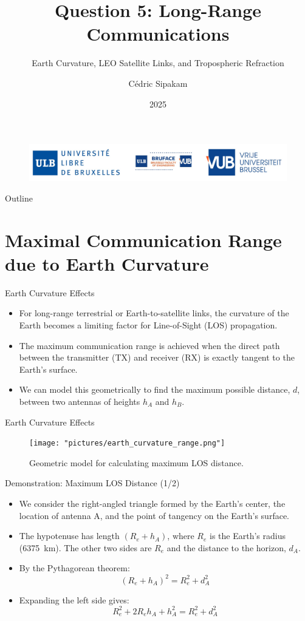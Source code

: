 \documentclass{beamer}
\title[Long-Range Communications]{Question 5: Long-Range Communications}
\subtitle{Earth Curvature, LEO Satellite Links, and Tropospheric Refraction}
\author{Cédric Sipakam}
\institute{ULB | VUB \\
	\vspace{1.5em}
	ELEC-H415: Communication Channels}
\date{2025}
\begin{document}
	\begin{frame}
		\begin{figure}
			\centering
			\includegraphics[width=0.7\linewidth]{pictures/logos}
		\end{figure}
		\titlepage
	\end{frame}
	
	\begin{frame}{Outline}
		\tableofcontents
	\end{frame}
	
	\section{Maximal Communication Range due to Earth Curvature}
	
	\begin{frame}{Earth Curvature Effects}
		\begin{itemize}
			\item For long-range terrestrial or Earth-to-satellite links, the curvature of the Earth becomes a limiting factor for Line-of-Sight (LOS) propagation.
			\item The maximum communication range is achieved when the direct path between the transmitter (TX) and receiver (RX) is exactly tangent to the Earth's surface.
			\item We can model this geometrically to find the maximum possible distance, $d$, between two antennas of heights $h_A$ and $h_B$.
		\end{itemize}
	\end{frame}
	
	\begin{frame}{Earth Curvature Effects}
		\begin{figure}
			\centering
			\texttt{[image: "pictures/earth\_curvature\_range.png"]}
			\caption{Geometric model for calculating maximum LOS distance.}
		\end{figure}
	\end{frame}
	
	\begin{frame}{Demonstration: Maximum LOS Distance (1/2)}
		\begin{itemize}
			\item We consider the right-angled triangle formed by the Earth's center, the location of antenna A, and the point of tangency on the Earth's surface.
			\item The hypotenuse has length $(R_e + h_A)$, where $R_e$ is the Earth's radius (\SI{6375}{km}). The other two sides are $R_e$ and the distance to the horizon, $d_A$.
			\item By the Pythagorean theorem:
			\[ (R_e + h_A)^2 = R_e^2 + d_A^2 \]
			\item Expanding the left side gives:
			\[ R_e^2 + 2R_e h_A + h_A^2 = R_e^2 + d_A^2 \]
		\end{itemize}
	\end{frame}
	
\end{document}
